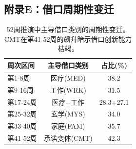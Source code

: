 \documentclass[journal]{IEEEtran}
\begin{document}
\subsection*{附录E：借口周期性变迁}

\begin{table}[ht]
\begin{center}
\footnotesize
\begin{tabular}{lcc}
\toprule
周次区间 & 主导借口类别 & 占比(\%) \\
\midrule
第1-8周 & 医疗(MED) & 38.2 \\
第9-16周 & 工作(WRK) & 31.5 \\
第17-24周 & 医疗+工作 & 28.3+27.1 \\
第25-32周 & 玄学(MYS) & 34.0 \\
第33-40周 & 家庭(FAM) & 35.7 \\
第41-52周 & 承诺变体(CMT) & 42.3 \\
\bottomrule
\end{tabular}
\end{center}
\caption{52周推演中主导借口类别的周期性变迁。CMT在第41-52周的飙升暗示借口创新能力枯竭。}
\label{tab:excuse_cycle}
\end{table}
\normalsize
\end{document}

